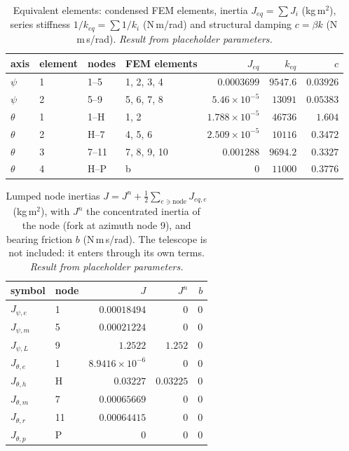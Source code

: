 \documentclass[10pt,a4paper]{article}
\numberwithin{equation}{section}
\begin{document}
\begin{table}[H]\centering\small
\caption{Equivalent elements: condensed FEM elements, inertia $J_{eq} = \sum J_i$ (kg\,m$^2$), series stiffness $1/k_{eq} = \sum 1/k_i$ (N\,m/rad) and structural damping $c = \beta k$ (N\,m\,s/rad). \emph{Result from placeholder parameters.}}\label{tab:lump_elements}
\begin{tabular}{llllrrr}\toprule
axis & element & nodes & FEM elements & $J_{eq}$ & $k_{eq}$ & $c$ \\ \midrule
$\psi$ & 1 & 1--5 & 1, 2, 3, 4 & $0.0003699$ & $9547.6$ & $0.03926$ \\
$\psi$ & 2 & 5--9 & 5, 6, 7, 8 & $5.46\times10^{-5}$ & $13091$ & $0.05383$ \\
$\theta$ & 1 & 1--H & 1, 2 & $1.788\times10^{-5}$ & $46736$ & $1.604$ \\
$\theta$ & 2 & H--7 & 4, 5, 6 & $2.509\times10^{-5}$ & $10116$ & $0.3472$ \\
$\theta$ & 3 & 7--11 & 7, 8, 9, 10 & $0.001288$ & $9694.2$ & $0.3327$ \\
$\theta$ & 4 & H--P & b & $0$ & $11000$ & $0.3776$ \\
\bottomrule\end{tabular}\end{table}
\begin{table}[H]\centering\small
\caption{Lumped node inertias $J = J^n + \tfrac12\sum_{e\ni\text{node}}J_{eq,e}$ (kg\,m$^2$), with $J^n$ the concentrated inertia of the node (fork at azimuth node 9), and bearing friction $b$ (N\,m\,s/rad). The telescope is not included: it enters through its own terms. \emph{Result from placeholder parameters.}}\label{tab:lump_nodes}
\begin{tabular}{llrrr}\toprule
symbol & node & $J$ & $J^n$ & $b$ \\ \midrule
$J_{\psi,e}$ & 1 & $0.00018494$ & $0$ & $0$ \\
$J_{\psi,m}$ & 5 & $0.00021224$ & $0$ & $0$ \\
$J_{\psi,L}$ & 9 & $1.2522$ & $1.252$ & $0$ \\
$J_{\theta,e}$ & 1 & $8.9416\times10^{-6}$ & $0$ & $0$ \\
$J_{\theta,h}$ & H & $0.03227$ & $0.03225$ & $0$ \\
$J_{\theta,m}$ & 7 & $0.00065669$ & $0$ & $0$ \\
$J_{\theta,r}$ & 11 & $0.00064415$ & $0$ & $0$ \\
$J_{\theta,p}$ & P & $0$ & $0$ & $0$ \\
\bottomrule\end{tabular}\end{table}
\end{document}
